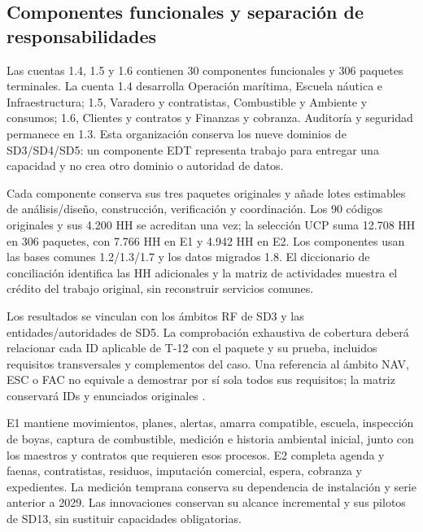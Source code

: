 \subsection{Componentes funcionales y separación de responsabilidades}
Las cuentas 1.4, 1.5 y 1.6 contienen 30 componentes funcionales y 306 paquetes terminales. La cuenta 1.4 desarrolla Operación marítima, Escuela náutica e Infraestructura; 1.5, Varadero y contratistas, Combustible y Ambiente y consumos; 1.6, Clientes y contratos y Finanzas y cobranza. Auditoría y seguridad permanece en 1.3. Esta organización conserva los nueve dominios de SD3/SD4/SD5: un componente EDT representa trabajo para entregar una capacidad y no crea otro dominio o autoridad de datos.

Cada componente conserva sus tres paquetes originales y añade lotes estimables de análisis/diseño, construcción, verificación y coordinación. Los 90 códigos originales y sus 4.200 HH se acreditan una vez; la selección UCP suma 12.708 HH en 306 paquetes, con 7.766 HH en E1 y 4.942 HH en E2. Los componentes usan las bases comunes 1.2/1.3/1.7 y los datos migrados 1.8. El diccionario de conciliación identifica las HH adicionales y la matriz de actividades muestra el crédito del trabajo original, sin reconstruir servicios comunes.

Los resultados se vinculan con los ámbitos RF de SD3 y las entidades/autoridades de SD5. La comprobación exhaustiva de cobertura deberá relacionar cada ID aplicable de T-12 con el paquete y su prueba, incluidos requisitos transversales y complementos del caso. Una referencia al ámbito NAV, ESC o FAC no equivale a demostrar por sí sola todos sus requisitos; la matriz conservará IDs y enunciados originales \parencite[caps.~19--20]{bases-transversales}.

E1 mantiene movimientos, planes, alertas, amarra compatible, escuela, inspección de boyas, captura de combustible, medición e historia ambiental inicial, junto con los maestros y contratos que requieren esos procesos. E2 completa agenda y faenas, contratistas, residuos, imputación comercial, espera, cobranza y expedientes. La medición temprana conserva su dependencia de instalación y serie anterior a 2029. Las innovaciones conservan su alcance incremental y sus pilotos de SD13, sin sustituir capacidades obligatorias.

